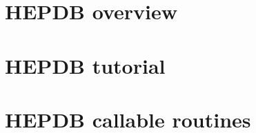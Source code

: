 \documentclass[11pt]{cernman}
\begin{document}

{}
\setcounter{page}{1}
\part{HEPDB overview}

\part{HEPDB tutorial}

\part{HEPDB callable routines}

\begin{appendix}

\end{appendix}

\end{document}
